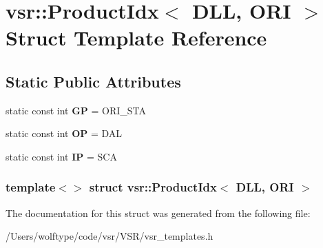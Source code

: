 \hypertarget{structvsr_1_1_product_idx_3_01_d_l_l_00_01_o_r_i_01_4}{\section{vsr\-:\-:Product\-Idx$<$ D\-L\-L, O\-R\-I $>$ Struct Template Reference}
\label{structvsr_1_1_product_idx_3_01_d_l_l_00_01_o_r_i_01_4}
}
\subsection*{Static Public Attributes}
\begin{DoxyCompactItemize}
\item 
\hypertarget{structvsr_1_1_product_idx_3_01_d_l_l_00_01_o_r_i_01_4_a10de10a2058585da472e7615700d5434}{static const int {\bfseries G\-P} = O\-R\-I\-\_\-\-S\-T\-A}\label{structvsr_1_1_product_idx_3_01_d_l_l_00_01_o_r_i_01_4_a10de10a2058585da472e7615700d5434}

\item 
\hypertarget{structvsr_1_1_product_idx_3_01_d_l_l_00_01_o_r_i_01_4_a8c4cb8cf5fdbfed3eb1d2aa49b32ad9b}{static const int {\bfseries O\-P} = D\-A\-L}\label{structvsr_1_1_product_idx_3_01_d_l_l_00_01_o_r_i_01_4_a8c4cb8cf5fdbfed3eb1d2aa49b32ad9b}

\item 
\hypertarget{structvsr_1_1_product_idx_3_01_d_l_l_00_01_o_r_i_01_4_ac7f5a511da7c1e29160203479cc89236}{static const int {\bfseries I\-P} = S\-C\-A}\label{structvsr_1_1_product_idx_3_01_d_l_l_00_01_o_r_i_01_4_ac7f5a511da7c1e29160203479cc89236}

\end{DoxyCompactItemize}
\subsubsection*{template$<$$>$ struct vsr\-::\-Product\-Idx$<$ D\-L\-L, O\-R\-I $>$}



The documentation for this struct was generated from the following file\-:\begin{DoxyCompactItemize}
\item 
/\-Users/wolftype/code/vsr/\-V\-S\-R/vsr\-\_\-templates.\-h\end{DoxyCompactItemize}
